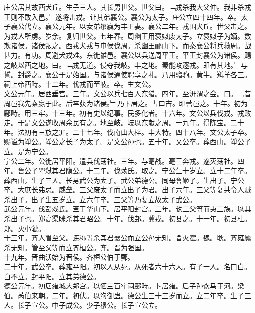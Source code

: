 \documentclass{zhvt-classic}
\begin{document}
\hspace*{2em}庄公居其故西犬丘。生子三人。其长男世父。世父曰。﹁戎杀我大父仲。我非杀戎王则不敢入邑。﹂遂将击戎。让其弟襄公。襄公为太子。庄公立四十四年。卒。太子襄公代立。襄公元年。以女弟缪嬴为丰王妻。襄公二年。戎围犬丘。世父击之。为戎人所虏。岁余。复归世父。七年春。周幽王用褒姒废太子。立褒姒子为嫡。数欺诸侯。诸侯叛之。西戎犬戎与申侯伐周。杀幽王郦山下。而秦襄公将兵救周。战甚力。有功。周避犬戎难。东徙雒邑。襄公以兵送周平王。平王封襄公为诸侯。赐之岐以西之地。曰。﹁戎无道。侵夺我岐。丰之地。秦能攻逐戎。即有其地。﹂与誓。封爵之。襄公于是始国。与诸侯通使聘享之礼。乃用骝驹。黄牛。羝羊各三。祠上帝西畤。十二年。伐戎而至岐。卒。生文公。\\
\hspace*{2em}文公元年。居西垂宫。三年。文公以兵七百人东猎。四年。至汧渭之会。曰。﹁昔周邑我先秦嬴于此。后卒获为诸侯。﹂乃卜居之。占曰吉。即营邑之。十年。初为鄜畤。用三牢。十三年。初有史以纪事。民多化者。十六年。文公以兵伐戎。戎败走。于是文公遂收周余民有之。地至岐。岐以东献之周。十九年。得陈宝。二十年。法初有三族之罪。二十七年。伐南山大梓。丰大特。四十八年。文公太子卒。赐谥为竫公。竫公之长子为太子。是文公孙也。五十年。文公卒。葬西山。竫公子立。是为宁公。\\
\hspace*{2em}宁公二年。公徙居平阳。遣兵伐荡社。三年。与亳战。亳王奔戎。遂灭荡社。四年。鲁公子翚弑其君隐公。十二年。伐荡氏。取之。宁公生十岁立。立十二年卒。葬西山。生子三人。长男武公为太子。武公弟德公。同母鲁姬子。生出子。宁公卒。大庶长弗忌。威垒。三父废太子而立出子为君。出子六年。三父等复共令人贼杀出子。出子生五岁立。立六年卒。三父等乃复立故太子武公。\\
\hspace*{2em}武公元年。伐彭戏氏。至于华山下。居平阳封宫。三年。诛三父等而夷三族。以其杀出子也。郑高渠眯杀其君昭公。十年。伐邽。冀戎。初县之。十一年。初县杜。郑。灭小虢。\\
\hspace*{2em}十三年。齐人管至父。连称等杀其君襄公而立公孙无知。晋灭霍。魏。耿。齐雍廪杀无知。管至父等而立齐桓公。齐。晋为强国。\\
\hspace*{2em}十九年。晋曲沃始为晋侯。齐桓公伯于鄄。\\
\hspace*{2em}二十年。武公卒。葬雍平阳。初以人从死。从死者六十六人。有子一人。名曰白。白不立。封平阳。立其弟德公。\\
\hspace*{2em}德公元年。初居雍城大郑宫。以牺三百牢祠鄜畤。卜居雍。后子孙饮马于河。梁伯。芮伯来朝。二年。初伏。以狗御蛊。德公生三十三岁而立。立二年卒。生子三人。长子宣公。中子成公。少子穆公。长子宣公立。\\
\end{document}
